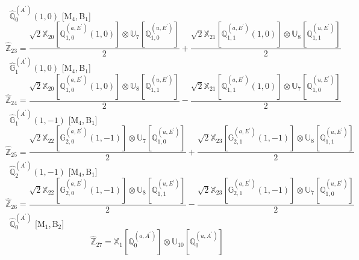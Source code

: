 \documentclass[fleqn,10pt,landscape]{article}
\begin{document}
\begin{itemize}
\vspace{4mm}
\noindent {} $\,\,\,\hat{\mathbb{Q}}_{0}^{(A^{\prime})}(1,0)$ [M$_{4}$,\,B$_{1}$]
\begin{dmath*}
\hat{\mathbb{Z}}_{23}=\frac{\sqrt{2} \mathbb{X}_{20}[\mathbb{Q}_{1,0}^{(a,E^{\prime})}(1,0)] \otimes\mathbb{U}_{7}[\mathbb{Q}_{1,0}^{(u,E^{\prime})}]}{2} + \frac{\sqrt{2} \mathbb{X}_{21}[\mathbb{Q}_{1,1}^{(a,E^{\prime})}(1,0)] \otimes\mathbb{U}_{8}[\mathbb{Q}_{1,1}^{(u,E^{\prime})}]}{2}
\end{dmath*}
\vspace{4mm}
\noindent {} $\,\,\,\hat{\mathbb{G}}_{1}^{(A^{\prime})}(1,0)$ [M$_{4}$,\,B$_{1}$]
\begin{dmath*}
\hat{\mathbb{Z}}_{24}=\frac{\sqrt{2} \mathbb{X}_{20}[\mathbb{Q}_{1,0}^{(a,E^{\prime})}(1,0)] \otimes\mathbb{U}_{8}[\mathbb{Q}_{1,1}^{(u,E^{\prime})}]}{2} - \frac{\sqrt{2} \mathbb{X}_{21}[\mathbb{Q}_{1,1}^{(a,E^{\prime})}(1,0)] \otimes\mathbb{U}_{7}[\mathbb{Q}_{1,0}^{(u,E^{\prime})}]}{2}
\end{dmath*}
\vspace{4mm}
\noindent {} $\,\,\,\hat{\mathbb{G}}_{1}^{(A^{\prime})}(1,-1)$ [M$_{4}$,\,B$_{1}$]
\begin{dmath*}
\hat{\mathbb{Z}}_{25}=\frac{\sqrt{2} \mathbb{X}_{22}[\mathbb{G}_{2,0}^{(a,E^{\prime})}(1,-1)] \otimes\mathbb{U}_{7}[\mathbb{Q}_{1,0}^{(u,E^{\prime})}]}{2} + \frac{\sqrt{2} \mathbb{X}_{23}[\mathbb{G}_{2,1}^{(a,E^{\prime})}(1,-1)] \otimes\mathbb{U}_{8}[\mathbb{Q}_{1,1}^{(u,E^{\prime})}]}{2}
\end{dmath*}
\vspace{4mm}
\noindent {} $\,\,\,\hat{\mathbb{Q}}_{2}^{(A^{\prime})}(1,-1)$ [M$_{4}$,\,B$_{1}$]
\begin{dmath*}
\hat{\mathbb{Z}}_{26}=\frac{\sqrt{2} \mathbb{X}_{22}[\mathbb{G}_{2,0}^{(a,E^{\prime})}(1,-1)] \otimes\mathbb{U}_{8}[\mathbb{Q}_{1,1}^{(u,E^{\prime})}]}{2} - \frac{\sqrt{2} \mathbb{X}_{23}[\mathbb{G}_{2,1}^{(a,E^{\prime})}(1,-1)] \otimes\mathbb{U}_{7}[\mathbb{Q}_{1,0}^{(u,E^{\prime})}]}{2}
\end{dmath*}
\vspace{4mm}
\noindent {} $\,\,\,\hat{\mathbb{Q}}_{0}^{(A^{\prime})}$ [M$_{1}$,\,B$_{2}$]
\begin{dmath*}
\hat{\mathbb{Z}}_{27}=\mathbb{X}_{1}[\mathbb{Q}_{0}^{(a,A^{\prime})}] \otimes\mathbb{U}_{10}[\mathbb{Q}_{0}^{(u,A^{\prime})}]
\end{dmath*}
\vspace{4mm}

\end{itemize}
\end{document}
